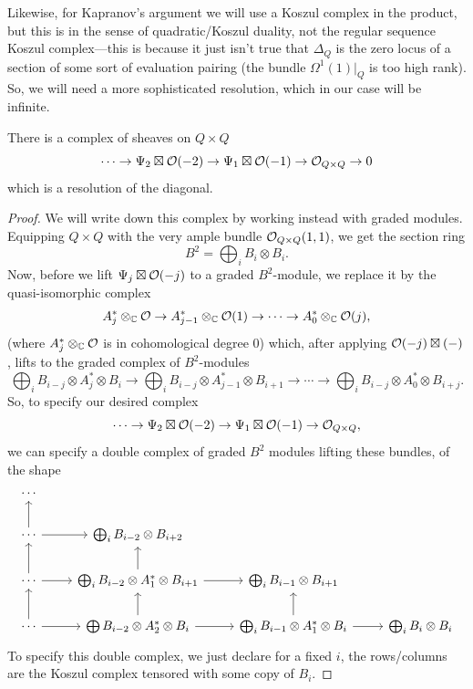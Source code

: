 \documentclass[12pt]{article}
\begin{document}
Likewise, for Kapranov's argument we will use a Koszul complex in the product, but this is in the sense of quadratic/Koszul duality, not the regular sequence Koszul complex---this is because it just isn't true that $\Delta_Q$ is the zero locus of a section of some sort of evaluation pairing (the bundle $\Omega^1(1)|_Q$ is too high rank). So, we will need a more sophisticated resolution, which in our case will be infinite.

\begin{prop}
    There is a complex of sheaves on $Q\times Q$
    \[\cdots \to \Psi_2 \boxtimes \mathcal{O}(-2) \to \Psi_1 \boxtimes \mathcal{O}(-1) \to \mathcal{O}_{Q \times Q} \to 0\]
    which is a resolution of the diagonal.
\end{prop}

\begin{proof}
    We will write down this complex by working instead with graded modules. Equipping $Q\times Q$ with the very ample bundle $\mathcal{O}_{Q\times Q}(1,1)$, we get the section ring
    \[B^2 = \bigoplus_i B_i \otimes B_i.\]
    Now, before we lift $\Psi_j \boxtimes \mathcal{O}(-j)$ to a graded $B^2$-module, we replace it by the quasi-isomorphic complex
    \[A_j^* \otimes_{\mathbb{C}} \mathcal{O} \to A_{j-1}^* \otimes_{\mathbb{C}} \mathcal{O}(1) \to \cdots \to A_0^* \otimes_{\mathbb{C}} \mathcal{O}(j),\]
    (where $A_j^* \otimes_{\mathbb{C}} \mathcal{O}$ is in cohomological degree 0) which, after applying $\mathcal{O}(-j) \boxtimes (-)$, lifts to the graded complex of $B^2$-modules
    \[\bigoplus_i B_{i-j} \otimes A_j^* \otimes B_i \to \bigoplus_i B_{i-j} \otimes A_{j-1}^* \otimes B_{i+1} \to \cdots \to \bigoplus_i B_{i-j} \otimes A_0^* \otimes B_{i+j}.\]
    So, to specify our desired complex
    \[\cdots \to \Psi_2 \boxtimes \mathcal{O}(-2) \to \Psi_1 \boxtimes \mathcal{O}(-1) \to \mathcal{O}_{Q \times Q},\]
    we can specify a double complex of graded $B^2$ modules lifting these bundles, of the shape
    \[\begin{tikzcd}
        \cdots &&&\\
        \cdots \rar \uar &\bigoplus_i B_{i-2} \otimes B_{i+2} &&\\
        \cdots \rar \uar &\bigoplus_i B_{i-2} \otimes A_1^* \otimes B_{i+1} \rar \uar & \bigoplus_i B_{i-1} \otimes B_{i+1} &\\
        \cdots \rar \uar &\bigoplus B_{i-2} \otimes A_2^* \otimes B_i \rar \uar & \bigoplus_i B_{i-1} \otimes A_1^* \otimes B_i \rar \uar & \bigoplus_i B_i\otimes B_i
    \end{tikzcd}\]
    To specify this double complex, we just declare for a fixed $i$, the rows/columns are the Koszul complex tensored with some copy of $B_i$.


\end{proof}
\end{document}
